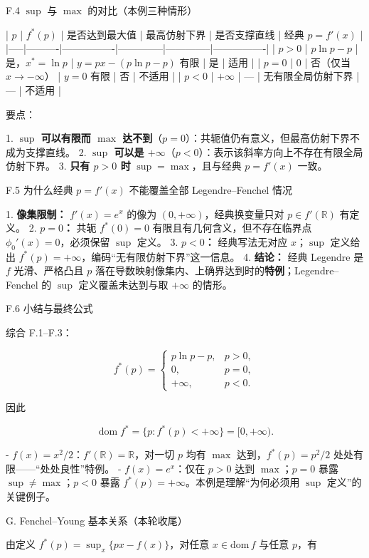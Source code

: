 \documentclass[
    lang=cn,
    color=blue,
    mode=fancy,
    thmcnt=section,
    scheme=chinese
]{elegantbook}
\begin{document}
\par
F.4 $\sup$ 与 $\max$ 的对比（本例三种情形）

| $p$ | $f^*(p)$ | 是否达到最大值 | 最高仿射下界 | 是否支撑直线 | 经典 $p=f'(x)$ |
|-----|----------|----------------|--------------|--------------|----------------|
| $p > 0$ | $p\ln p - p$ | 是，$x^*=\ln p$ | $y=px-(p\ln p-p)$ 有限 | 是 | 适用 |
| $p = 0$ | $0$ | 否（仅当 $x\to-\infty$） | $y=0$ 有限 | 否 | 不适用 |
| $p < 0$ | $+\infty$ | — | 无有限全局仿射下界 | — | 不适用 |

要点：

1. \textbf{$\sup$ 可以有限而 $\max$ 达不到}（$p=0$）：共轭值仍有意义，但最高仿射下界不成为支撑直线。
2. \textbf{$\sup$ 可以是 $+\infty$}（$p<0$）：表示该斜率方向上不存在有限全局仿射下界。
3. \textbf{只有 $p>0$ 时} $\sup=\max$，且与经典 $p=f'(x)$ 一致。

\par
F.5 为什么经典 $p=f'(x)$ 不能覆盖全部 Legendre–Fenchel 情况

1. \textbf{像集限制：} $f'(x)=e^x$ 的像为 $(0,+\infty)$，经典换变量只对 $p\in f'(\mathbb{R})$ 有定义。
2. \textbf{$p=0$：} 共轭 $f^*(0)=0$ 有限且有几何含义，但不存在临界点 $\phi_0'(x)=0$，必须保留 $\sup$ 定义。
3. \textbf{$p<0$：} 经典写法无对应 $x$；$\sup$ 定义给出 $f^*(p)=+\infty$，编码“无有限仿射下界”这一信息。
4. \textbf{结论：} 经典 Legendre 是 $f$ 光滑、严格凸且 $p$ 落在导数映射像集内、上确界达到时的\textbf{特例}；Legendre–Fenchel 的 $\sup$ 定义覆盖未达到与取 $+\infty$ 的情形。

\par
F.6 小结与最终公式

综合 F.1–F.3：

\[
f^*(p)=
\begin{cases}
p\ln p-p,& p>0,\\
0,& p=0,\\
+\infty,& p<0.
\end{cases}
\]

因此

\[
\operatorname{dom} f^* = \{ p : f^*(p) < +\infty \} = [0,+\infty).
\]

- $f(x)=x^2/2$：$f'(\mathbb{R})=\mathbb{R}$，对一切 $p$ 均有 $\max$ 达到，$f^*(p)=p^2/2$ 处处有限——“处处良性”特例。
- $f(x)=e^x$：仅在 $p>0$ 达到 $\max$；$p=0$ 暴露 $\sup\neq\max$；$p<0$ 暴露 $f^*(p)=+\infty$。本例是理解“为何必须用 $\sup$ 定义”的关键例子。

\par
G. Fenchel–Young 基本关系（本轮收尾）

由定义 $f^*(p)=\sup_x\{px-f(x)\}$，对任意 $x\in\mathrm{dom}\,f$ 与任意 $p$，有
\end{document}
